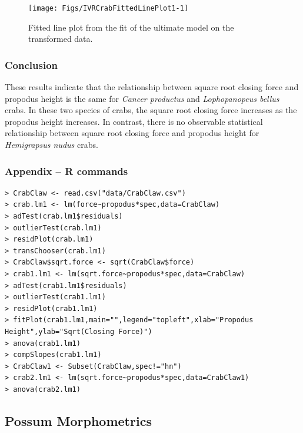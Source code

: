 \documentclass[10pt,openany]{book}\usepackage[]{graphicx}\usepackage[]{color}
\newenvironment{knitrout}{}{} %
\begin{document}
\begin{knitrout}
\color{fgcolor}\begin{figure}[h]

{\centering \texttt{[image: Figs/IVRCrabFittedLinePlot1-1]} 

}

\caption[Fitted line plot from the fit of the ultimate model on the transformed data]{Fitted line plot from the fit of the ultimate model on the transformed data.}\label{fig:IVRCrabFittedLinePlot1}
\end{figure}


\end{knitrout}

\subsubsection*{Conclusion}
These results indicate that the relationship between square root closing force and propodus height is the same for \emph{Cancer productus} and \emph{Lophopanopeus bellus} crabs.  In these two species of crabs, the square root closing force increases as the propodus height increases.  In contrast, there is no observable statistical relationship between square root closing force and propodus height for \emph{Hemigrapsus nudus} crabs.

\subsubsection*{Appendix -- R commands}
\begin{Verbatim}[formatcom=\color{red},xleftmargin=5mm,commandchars=\\\{\}]
> CrabClaw <- read.csv("data/CrabClaw.csv")
> crab.lm1 <- lm(force~propodus*spec,data=CrabClaw)
> adTest(crab.lm1$residuals)
> outlierTest(crab.lm1)
> residPlot(crab.lm1)
> transChooser(crab.lm1)
> CrabClaw$sqrt.force <- sqrt(CrabClaw$force)
> crab1.lm1 <- lm(sqrt.force~propodus*spec,data=CrabClaw)
> adTest(crab1.lm1$residuals)
> outlierTest(crab1.lm1)
> residPlot(crab1.lm1)
> fitPlot(crab1.lm1,main="",legend="topleft",xlab="Propodus Height",ylab="Sqrt(Closing Force)")
> anova(crab1.lm1)
> compSlopes(crab1.lm1)
> CrabClaw1 <- Subset(CrabClaw,spec!="hn")
> crab2.lm1 <- lm(sqrt.force~propodus*spec,data=CrabClaw1)
> anova(crab2.lm1)
\end{Verbatim}


\subsection{Possum Morphometrics}
\end{document}
